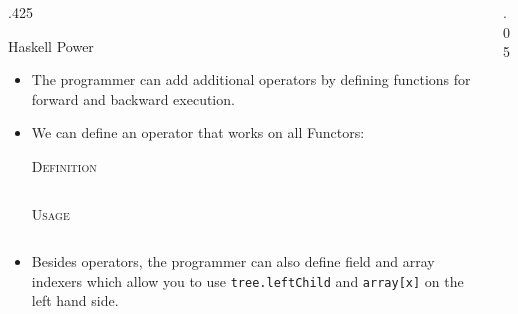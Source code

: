 \documentclass[final,hyperref={pdfpagelabels=false}]{beamer}
\newcommand\sepsize{.05\textwidth}
\newcommand\colsize{.425\textwidth}
\newcommand{\code}[2]{
	\begin{center}
		\vspace{.5cm}
		\textsc{\small #1}\\
		\vspace{.5cm}
	\end{center}
	\begin{minipage}{.9\textwidth}
		\inputminted[frame=lines,framesep=1cm,baselinestretch=.8,linenos,fontsize=\footnotesize]
			{haskell}{code/#2.hs}
	\end{minipage}
}
\begin{document}
\begin{frame}[t]
\begin{columns}[t]
\begin{column}{\colsize}
\begin{block}{Haskell Power}
	\begin{itemize}
	\item The programmer can add additional operators by defining functions for forward and backward execution.
	\item We can define an operator that works on all Functors:
		\code{Definition}{functor_def}
		\vspace{1cm}
		\code{Usage}{functor_usage}
		\vspace{1cm}
	\item Besides operators, the programmer can also define field and array indexers which allow you to use \texttt{tree.leftChild} and \texttt{array[x]} on the left hand side.
	\end{itemize}
\end{block}


\end{column} %

\begin{column}{\sepsize}\end{column} %

\end{columns} %

\end{frame} %
\end{document}
